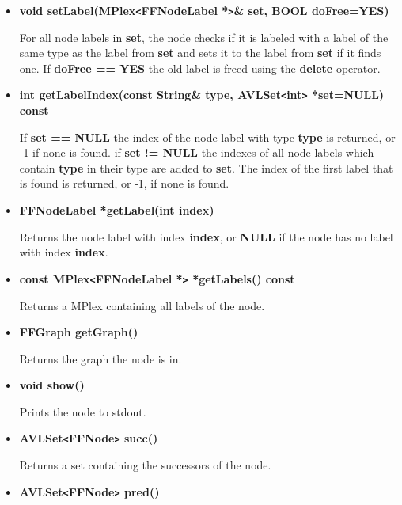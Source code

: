 \begin{itemize}
  Sets the node label of index {\bf index} to {\bf label}. If
  {\bf doFree == YES} the old label is freed using the {\bf
    delete} operator. If {\bf index == -1} the node checks if it
  is labeled with a node label of the same type as {\bf label}
  and sets it to {\bf label} if it finds one.
  
\item{\bf void setLabel(MPlex\verb|<|FFNodeLabel *\verb|>|\& set,
    BOOL doFree=YES)}
    
  For all node labels in {\bf set}, the node checks if it is
  labeled with a label of the same type as the label from {\bf
    set} and sets it to the label from {\bf set} if it finds one.
  If {\bf doFree == YES} the old label is freed using the {\bf
    delete} operator.
 
\item{\bf int getLabelIndex(const String\& type,
    AVLSet\verb|<|int\verb|>| *set=NULL) const}
  
  If {\bf set == NULL} the index of the node label with type {\bf
    type} is returned, or -1 if none is found.  if {\bf set !=
    NULL} the indexes of all node labels which contain {\bf type}
  in their type are added to {\bf set}. The index of the first
  label that is found is returned, or -1, if none is found.

\item{\bf FFNodeLabel *getLabel(int index)}
  
  Returns the node label with index {\bf index}, or {\bf NULL} if
  the node has no label with index {\bf index}.
  
\item{\bf const MPlex\verb|<|FFNodeLabel *\verb|>| *getLabels()
    const}

Returns a MPlex containing all labels of the node.

\item{\bf FFGraph getGraph()}

Returns the graph the node is in.

\item{\bf void show()}

Prints the node to stdout.
  
\item{\bf AVLSet\verb|<|FFNode\verb|>| succ()}

Returns a set containing the successors of the node.

\item{\bf AVLSet\verb|<|FFNode\verb|>| pred()}


\end{itemize}
